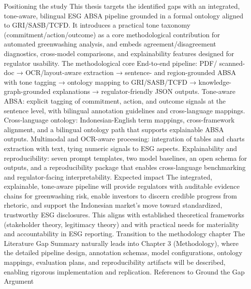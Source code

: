 Positioning the study
This thesis targets the identified gaps with an integrated, tone-aware, bilingual ESG ABSA pipeline grounded in a formal ontology aligned to GRI/SASB/TCFD. It introduces a practical tone taxonomy (commitment/action/outcome) as a core methodological contribution for automated greenwashing analysis, and embeds agreement/disagreement diagnostics, cross-model comparisons, and explainability features designed for regulator usability.
The methodological core
End-to-end pipeline: PDF/ scanned-doc → OCR/layout-aware extraction → sentence- and region-grounded ABSA with tone tagging → ontology mapping to GRI/SASB/TCFD → knowledge-graph-grounded explanations → regulator-friendly JSON outputs.
Tone-aware ABSA: explicit tagging of commitment, action, and outcome signals at the sentence level, with bilingual annotation guidelines and cross-language mappings.
Cross-language ontology: Indonesian-English term mappings, cross-framework alignment, and a bilingual ontology path that supports explainable ABSA outputs.
Multimodal and OCR-aware processing: integration of tables and charts extraction with text, tying numeric signals to ESG aspects.
Explainability and reproducibility: seven prompt templates, two model baselines, an open schema for outputs, and a reproducibility package that enables cross-language benchmarking and regulator-facing interpretability.
Expected impact
The integrated, explainable, tone-aware pipeline will provide regulators with auditable evidence chains for greenwashing risk, enable investors to discern credible progress from rhetoric, and support the Indonesian market's move toward standardized, trustworthy ESG disclosures. This aligns with established theoretical frameworks (stakeholder theory, legitimacy theory) and with practical needs for materiality and accountability in ESG reporting.
Transition to the methodology chapter
The Literature Gap Summary naturally leads into Chapter 3 (Methodology), where the detailed pipeline design, annotation schemas, model configurations, ontology mappings, evaluation plans, and reproducibility artifacts will be described, enabling rigorous implementation and replication.
References to Ground the Gap Argument

